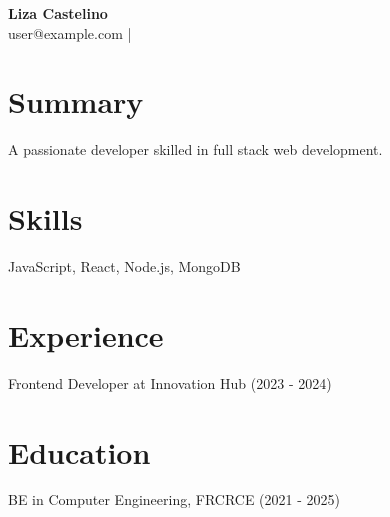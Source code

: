 \documentclass{article}
\begin{document}
\begin{center}
  {\LARGE \textbf{Liza Castelino}} \\
  \vspace{2mm}
  user@example.com \quad |  \\
\end{center}

\section*{Summary}
A passionate developer skilled in full stack web development.

\section*{Skills}
JavaScript, React, Node.js, MongoDB

\section*{Experience}
Frontend Developer at Innovation Hub (2023 - 2024)

\section*{Education}
BE in Computer Engineering, FRCRCE (2021 - 2025)
\end{document}

